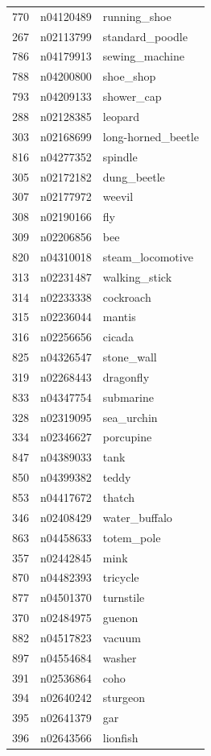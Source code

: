 \begin{table}
\begin{tabular}{cll}
770 & n04120489 & running_shoe \\
267 & n02113799 & standard_poodle \\
786 & n04179913 & sewing_machine \\
788 & n04200800 & shoe_shop \\
793 & n04209133 & shower_cap \\
288 & n02128385 & leopard \\
303 & n02168699 & long-horned_beetle \\
816 & n04277352 & spindle \\
305 & n02172182 & dung_beetle \\
307 & n02177972 & weevil \\
308 & n02190166 & fly \\
309 & n02206856 & bee \\
820 & n04310018 & steam_locomotive \\
313 & n02231487 & walking_stick \\
314 & n02233338 & cockroach \\
315 & n02236044 & mantis \\
316 & n02256656 & cicada \\
825 & n04326547 & stone_wall \\
319 & n02268443 & dragonfly \\
833 & n04347754 & submarine \\
328 & n02319095 & sea_urchin \\
334 & n02346627 & porcupine \\
847 & n04389033 & tank \\
850 & n04399382 & teddy \\
853 & n04417672 & thatch \\
346 & n02408429 & water_buffalo \\
863 & n04458633 & totem_pole \\
357 & n02442845 & mink \\
870 & n04482393 & tricycle \\
877 & n04501370 & turnstile \\
370 & n02484975 & guenon \\
882 & n04517823 & vacuum \\
897 & n04554684 & washer \\
391 & n02536864 & coho \\
394 & n02640242 & sturgeon \\
395 & n02641379 & gar \\
396 & n02643566 & lionfish \\

\end{tabular}
\end{table}
